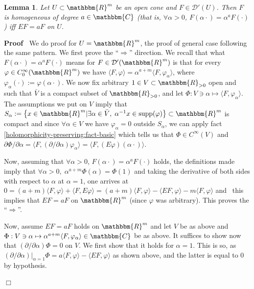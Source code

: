 \documentclass{article}
\newcommand{\assign}{:=}
\newcommand{\comma}{{,}}
\newcommand{\tmop}[1]{\ensuremath{\operatorname{#1}}}
\newenvironment{proof}{\noindent\textbf{Proof\ }}{\hspace*{\fill}$\Box$\medskip}
\numberwithin{definition}{section}
\newtheorem{lemma}{Lemma}
\numberwithin{lemma}{section}
\numberwithin{proposition}{section}
{\theorembodyfont{\rmfamily}\newtheorem{remark}{Remark}
\numberwithin{remark}{section}
}
\begin{document}
\begin{lemma}
  \label{lem67:lem-homogImpliesE}Let $U \subset \mathbbm{R}^m$ be an open cone
  and $F \in \mathcal{D}' ( U)$. Then $F$ is homogeneous of degree $a \in
  \mathbbm{C}$ (that is, $\forall \alpha > 0$, $F ( \alpha \cdot) = \alpha^a F
  ( \cdot)$) iff $E F = a F$ on $U$.
\end{lemma}

\begin{proof}
  We do proof for $U =\mathbbm{R}^m$, the proof of general case following the
  same pattern. We first prove the ``$\Rightarrow$'' direction. We recall that
  what $F ( \alpha \cdot) = \alpha^a F ( \cdot)$ means for $F \in \mathcal{D}'
  ( \mathbbm{R}^m)$ is that for every $\varphi \in C^{\infty}_0 (
  \mathbbm{R}^m)$ we have $\langle F, \varphi \rangle = \alpha^{a + m} \langle
  F, \varphi_{\alpha} \rangle$, where $\varphi_{\alpha} ( \cdot) \assign
  \varphi ( \alpha \cdot)$. We now fix arbitrary $1 \in V \subset
  \mathbbm{R}_{> 0}$ open and such that $\bar{V}$ is a compact subset of
  $\mathbbm{R}_{> 0}$, and let $\Phi : V \ni \alpha \mapsto \langle F,
  \varphi_{\alpha} \rangle$. The assumptions we put on $V$ imply that
  $S_{\alpha} \assign \left\{ x \in \mathbbm{R}^m | \exists \alpha \in
  \bar{V}, \; \alpha^{- 1} x \in \tmop{supp} ( \varphi) \right\} \subset
  \mathbbm{R}^m$ is compact and since $\forall \alpha \in V$ we have
  $\varphi_{\alpha} = 0$ outside $S_{\alpha}$, we can apply fact
  \ref{holomorphicity-preserving:fact-basic} which tells us that $\Phi \in
  C^{\infty} ( V)$ and $\partial \Phi / \partial \alpha = \langle F, (
  \partial / \partial \alpha) \varphi_{\alpha} \rangle = \langle F, ( E
  \varphi) ( \alpha \cdot) \rangle$.
  
  Now, assuming that $\forall \alpha > 0$, $F ( \alpha \cdot) = \alpha^a F (
  \cdot)$ holds, the definitions made imply that $\forall \alpha > 0, \;
  \alpha^{a + m} \Phi ( \alpha) = \Phi ( 1)$ and taking the derivative of both
  sides with respect to $\alpha$ at $\alpha = 1$, one arrives at $0 = ( a + m)
  \langle F, \varphi \rangle + \langle F, E \varphi \rangle = ( a + m) \langle
  F, \varphi \rangle - \langle E F, \varphi \rangle - m \langle F \comma
  \varphi \rangle$ and \ this implies that $E F = a F$ on $\mathbbm{R}^m$
  (since $\varphi$ was arbitrary). This proves the ``$\Rightarrow$''.
  
  Now, assume $E F = a F$ holds on $\mathbbm{R}^m$ and let $V$ be as above and
  $\Phi : V \ni \alpha \mapsto \alpha^{a + m} \langle F, \varphi_{\alpha}
  \rangle \in \mathbbm{C}$ be as above. It suffices to show now that $(
  \partial / \partial \alpha) \Phi = 0$ on $V$. We first show that it holds
  for $\alpha = 1$. This is so, as $( \partial / \partial \alpha) |_{\alpha =
  1} \Phi = a \langle F, \varphi \rangle - \langle E F, \varphi \rangle$ as
  shown above, and the latter is equal to 0 by hypothesis.
  

\end{proof}
\end{document}
